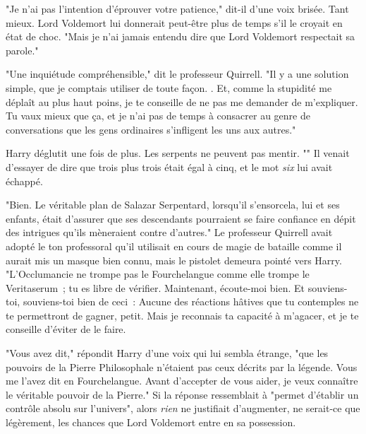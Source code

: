 "Je n'ai pas l'intention d'éprouver votre patience," dit-il d'une voix brisée. Tant mieux. Lord Voldemort lui donnerait peut-être plus de temps s'il le croyait en état de choc. "Mais je n'ai jamais entendu dire que Lord Voldemort respectait sa parole."

"Une inquiétude compréhensible," dit le professeur Quirrell. "Il y a une solution simple, que je comptais utiliser de toute façon. . Et, comme la stupidité me déplaît au plus haut poins, je te conseille de ne pas me demander de m'expliquer. Tu vaux mieux que ça, et je n'ai pas de temps à consacrer au genre de conversations que les gens ordinaires s'infligent les uns aux autres."

Harry déglutit une fois de plus. Les serpents ne peuvent pas mentir. "" Il venait d'essayer de dire que trois plus trois était égal à cinq, et le mot \emph{six} lui avait échappé.

"Bien. Le véritable plan de Salazar Serpentard, lorsqu'il s'ensorcela, lui et ses enfants, était d'assurer que ses descendants pourraient se faire confiance en dépit des intrigues qu'ils mèneraient contre d'autres." Le professeur Quirrell avait adopté le ton professoral qu'il utilisait en cours de magie de bataille comme il aurait mis un masque bien connu, mais le pistolet demeura pointé vers Harry. "L'Occlumancie ne trompe pas le Fourchelangue comme elle trompe le Veritaserum~; tu es libre de vérifier. Maintenant, écoute-moi bien.  Et souviens-toi, souviens-toi bien de ceci~:  Aucune des réactions hâtives que tu contemples ne te permettront de gagner, petit. Mais je reconnais ta capacité à m'agacer, et je te conseille d'éviter de le faire.

"Vous avez dit," répondit Harry d'une voix qui lui sembla étrange, "que les pouvoirs de la Pierre Philosophale n'étaient pas ceux décrits par la légende. Vous me l'avez dit en Fourchelangue. Avant d'accepter de vous aider, je veux connaître le véritable pouvoir de la Pierre." Si la réponse ressemblait à "permet d'établir un contrôle absolu sur l'univers", alors \emph{rien} ne justifiait d'augmenter, ne serait-ce que légèrement, les chances que Lord Voldemort entre en sa possession.

